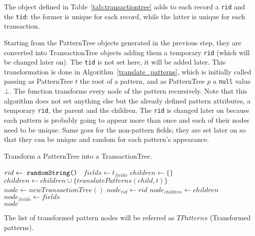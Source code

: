 \documentclass{acm_proc_article-sp-sigmod09}
\begin{document}
The object defined in Table~\ref{tab:transactiontree} adds to each record a \texttt{rid} and the \texttt{tid}: the former is unique for each record, while the latter is unique for each transaction.

Starting from the PatternTree objects generated in the previous step, they are converted into TransactionTree objects adding them a temporary \texttt{rid} (which will be changed later on). The \texttt{tid} is not set here, it will be added later. This transformation is done in Algorithm~\ref{translate_patterns}, which is initially called passing as PatternTree $t$ the root of a pattern, and as PatternTree $p$ a \texttt{null} value $\bot$. The function transforms every node of the pattern recursively. Note that this algorithm does not set anything else but the already defined pattern attributes, a temporary \texttt{rid}, the parent and the children. The \texttt{rid} is changed later on because each pattern is probably going to appear more than once and each of their nodes need to be unique. Same goes for the non-pattern fields; they are set later on so that they can be unique and random for each pattern's appearance. 

\begin{algorithm}
\caption{Transform a PatternTree into a TransactionTree.}
\label{translate_patterns}
\begin{algorithmic}[1]
\State $rid \gets \text{ \texttt{randomString() }}$
\State $fields \gets t_{fields}$
\State $children \gets \{\}$
	\State $children \gets children \cup \{translatePatterns(child, t)\}$
\EndFor
\State $node \gets new TransactionTree()$
\State $node_{rid} \gets rid$
\State $node_{children} \gets children$
\State $node_{fields} \gets fields$ \\
\Return $node$
\EndFunction
\end{algorithmic}
\end{algorithm}

The list of transformed pattern nodes will be referred as $TPatterns$ (Transformed patterns).
\end{document}
